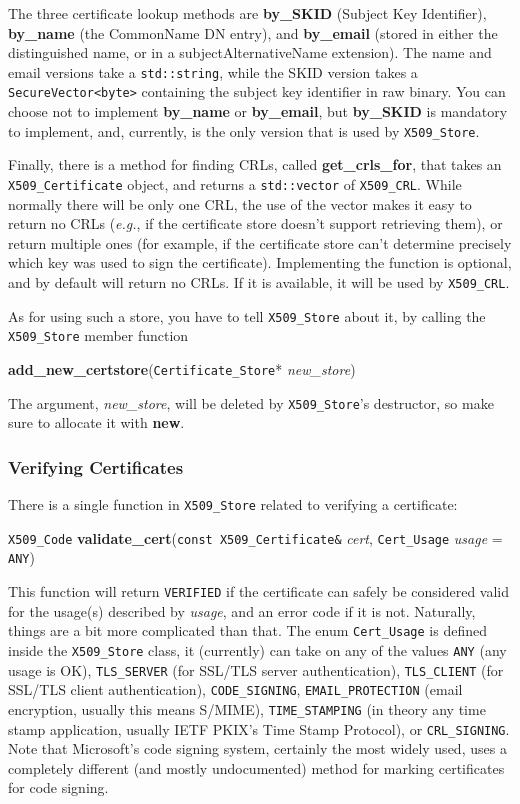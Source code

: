 \documentclass{article}
\newcommand{\function}[1]{\textbf{#1}}
\newcommand{\type}[1]{\texttt{#1}}
\renewcommand{\arg}[1]{\textsl{#1}}
\newcommand{\eg}[0]{\emph{e.g.}}
\begin{document}
The three certificate lookup methods are \function{by\_SKID} (Subject Key
Identifier), \function{by\_name} (the CommonName DN entry), and
\function{by\_email} (stored in either the distinguished name, or in a
subjectAlternativeName extension). The name and email versions take a
\type{std::string}, while the SKID version takes a \type{SecureVector<byte>}
containing the subject key identifier in raw binary. You can choose not to
implement \function{by\_name} or \function{by\_email}, but \function{by\_SKID}
is mandatory to implement, and, currently, is the only version that is used by
\type{X509\_Store}.

Finally, there is a method for finding CRLs, called
\function{get\_crls\_for}, that takes an \type{X509\_Certificate}
object, and returns a \type{std::vector} of \type{X509\_CRL}. While
normally there will be only one CRL, the use of the vector makes it
easy to return no CRLs (\eg, if the certificate store doesn't support
retrieving them), or return multiple ones (for example, if the
certificate store can't determine precisely which key was used to sign
the certificate). Implementing the function is optional, and by
default will return no CRLs. If it is available, it will be used by
\type{X509\_CRL}.

As for using such a store, you have to tell \type{X509\_Store} about
it, by calling the \type{X509\_Store} member function

\function{add\_new\_certstore}(\type{Certificate\_Store}* \arg{new\_store})

The argument, \arg{new\_store}, will be deleted by \type{X509\_Store}'s
destructor, so make sure to allocate it with \function{new}.

\subsubsection{Verifying Certificates}

There is a single function in \type{X509\_Store} related to verifying a
certificate:

\type{X509\_Code}
\function{validate\_cert}(\type{const X509\_Certificate\&} \arg{cert},
                          \type{Cert\_Usage} \arg{usage} = \type{ANY})

This function will return \type{VERIFIED} if the certificate can
safely be considered valid for the usage(s) described by \arg{usage},
and an error code if it is not. Naturally, things are a bit more
complicated than that. The enum \type{Cert\_Usage} is defined inside
the \type{X509\_Store} class, it (currently) can take on any of the
values \type{ANY} (any usage is OK), \type{TLS\_SERVER} (for SSL/TLS
server authentication), \type{TLS\_CLIENT} (for SSL/TLS client
authentication), \type{CODE\_SIGNING}, \type{EMAIL\_PROTECTION} (email
encryption, usually this means S/MIME), \type{TIME\_STAMPING} (in
theory any time stamp application, usually IETF PKIX's Time Stamp
Protocol), or \type{CRL\_SIGNING}. Note that Microsoft's code signing
system, certainly the most widely used, uses a completely different
(and mostly undocumented) method for marking certificates for code
signing.
\end{document}

